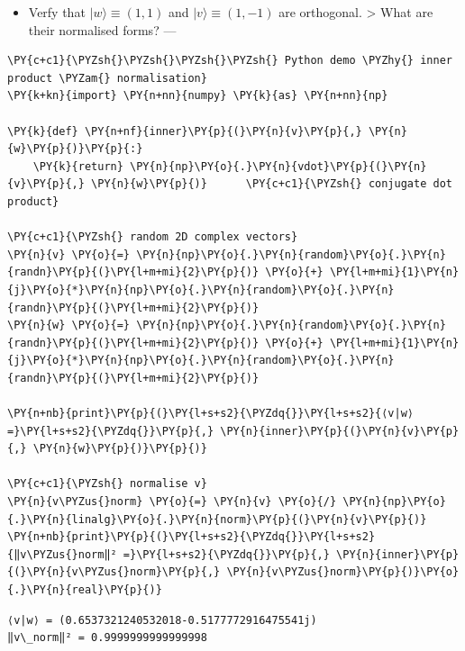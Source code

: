 \begin{itemize}
\tightlist
\item
  Verfy that \(\lvert w\rangle \equiv (1, 1)\) and
  \(\lvert v\rangle \equiv (1, -1)\) are orthogonal. \textgreater{} What
  are their normalised forms? ---
\end{itemize}

    \begin{tcolorbox}[breakable, size=fbox, boxrule=1pt, pad at break*=1mm,colback=cellbackground, colframe=cellborder]
\begin{Verbatim}[commandchars=\\\{\}]
\PY{c+c1}{\PYZsh{}\PYZsh{}\PYZsh{}\PYZsh{} Python demo \PYZhy{} inner product \PYZam{} normalisation}
\PY{k+kn}{import} \PY{n+nn}{numpy} \PY{k}{as} \PY{n+nn}{np}

\PY{k}{def} \PY{n+nf}{inner}\PY{p}{(}\PY{n}{v}\PY{p}{,} \PY{n}{w}\PY{p}{)}\PY{p}{:}
    \PY{k}{return} \PY{n}{np}\PY{o}{.}\PY{n}{vdot}\PY{p}{(}\PY{n}{v}\PY{p}{,} \PY{n}{w}\PY{p}{)}      \PY{c+c1}{\PYZsh{} conjugate dot product}

\PY{c+c1}{\PYZsh{} random 2D complex vectors}
\PY{n}{v} \PY{o}{=} \PY{n}{np}\PY{o}{.}\PY{n}{random}\PY{o}{.}\PY{n}{randn}\PY{p}{(}\PY{l+m+mi}{2}\PY{p}{)} \PY{o}{+} \PY{l+m+mi}{1}\PY{n}{j}\PY{o}{*}\PY{n}{np}\PY{o}{.}\PY{n}{random}\PY{o}{.}\PY{n}{randn}\PY{p}{(}\PY{l+m+mi}{2}\PY{p}{)}
\PY{n}{w} \PY{o}{=} \PY{n}{np}\PY{o}{.}\PY{n}{random}\PY{o}{.}\PY{n}{randn}\PY{p}{(}\PY{l+m+mi}{2}\PY{p}{)} \PY{o}{+} \PY{l+m+mi}{1}\PY{n}{j}\PY{o}{*}\PY{n}{np}\PY{o}{.}\PY{n}{random}\PY{o}{.}\PY{n}{randn}\PY{p}{(}\PY{l+m+mi}{2}\PY{p}{)}

\PY{n+nb}{print}\PY{p}{(}\PY{l+s+s2}{\PYZdq{}}\PY{l+s+s2}{⟨v|w⟩ =}\PY{l+s+s2}{\PYZdq{}}\PY{p}{,} \PY{n}{inner}\PY{p}{(}\PY{n}{v}\PY{p}{,} \PY{n}{w}\PY{p}{)}\PY{p}{)}

\PY{c+c1}{\PYZsh{} normalise v}
\PY{n}{v\PYZus{}norm} \PY{o}{=} \PY{n}{v} \PY{o}{/} \PY{n}{np}\PY{o}{.}\PY{n}{linalg}\PY{o}{.}\PY{n}{norm}\PY{p}{(}\PY{n}{v}\PY{p}{)}
\PY{n+nb}{print}\PY{p}{(}\PY{l+s+s2}{\PYZdq{}}\PY{l+s+s2}{‖v\PYZus{}norm‖² =}\PY{l+s+s2}{\PYZdq{}}\PY{p}{,} \PY{n}{inner}\PY{p}{(}\PY{n}{v\PYZus{}norm}\PY{p}{,} \PY{n}{v\PYZus{}norm}\PY{p}{)}\PY{o}{.}\PY{n}{real}\PY{p}{)}
\end{Verbatim}
\end{tcolorbox}

    \begin{Verbatim}[commandchars=\\\{\}]
⟨v|w⟩ = (0.6537321240532018-0.5177772916475541j)
‖v\_norm‖² = 0.9999999999999998
    \end{Verbatim}


